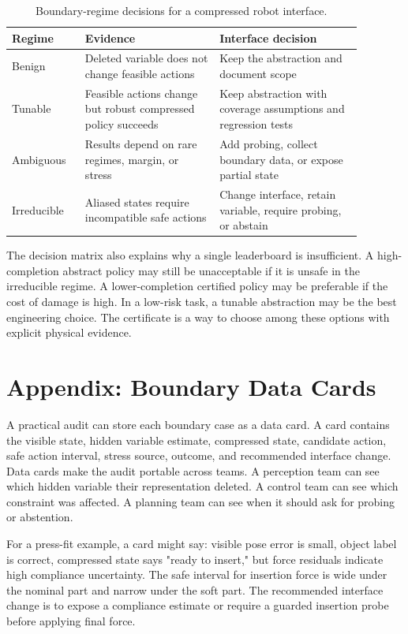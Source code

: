 \documentclass{article}
\begin{document}
\begin{table}[h]
\centering
\caption{Boundary-regime decisions for a compressed robot interface.}
\label{tab:decision-matrix}
\small
\begin{tabular}{p{0.18\linewidth}p{0.34\linewidth}p{0.36\linewidth}}
\toprule
Regime & Evidence & Interface decision \\
\midrule
Benign & Deleted variable does not change feasible actions & Keep the abstraction and document scope \\
Tunable & Feasible actions change but robust compressed policy succeeds & Keep abstraction with coverage assumptions and regression tests \\
Ambiguous & Results depend on rare regimes, margin, or stress & Add probing, collect boundary data, or expose partial state \\
Irreducible & Aliased states require incompatible safe actions & Change interface, retain variable, require probing, or abstain \\
\bottomrule
\end{tabular}
\end{table}

The decision matrix also explains why a single leaderboard is insufficient. A
high-completion abstract policy may still be unacceptable if it is unsafe in the
irreducible regime. A lower-completion certified policy may be preferable if the
cost of damage is high. In a low-risk task, a tunable abstraction may be the best
engineering choice. The certificate is a way to choose among these options with
explicit physical evidence.

\section{Appendix: Boundary Data Cards}

A practical audit can store each boundary case as a data card. A card contains
the visible state, hidden variable estimate, compressed state, candidate action,
safe action interval, stress source, outcome, and recommended interface change.
Data cards make the audit portable across teams. A perception team can see which
hidden variable their representation deleted. A control team can see which
constraint was affected. A planning team can see when it should ask for probing
or abstention.

For a press-fit example, a card might say: visible pose error is small, object
label is correct, compressed state says "ready to insert," but force residuals
indicate high compliance uncertainty. The safe interval for insertion force is
wide under the nominal part and narrow under the soft part. The recommended
interface change is to expose a compliance estimate or require a guarded
insertion probe before applying final force.
\end{document}
